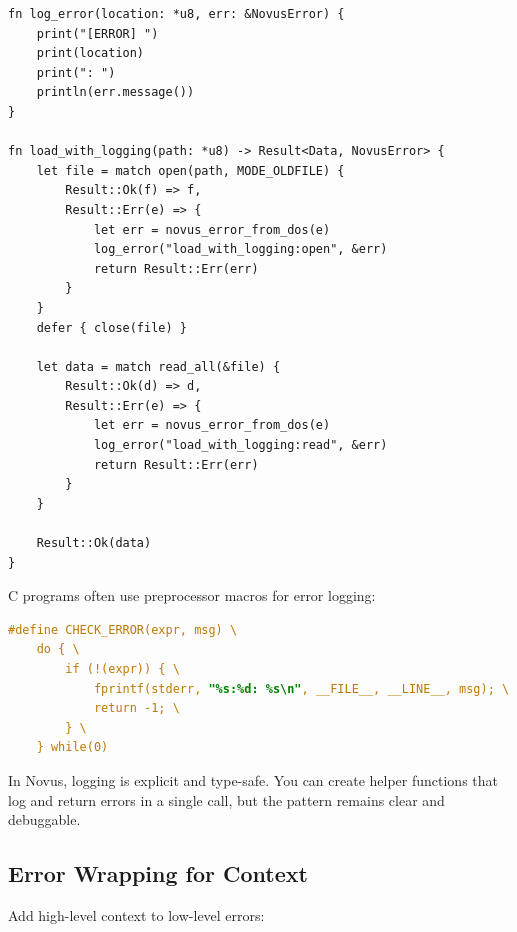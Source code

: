 \begin{lstlisting}
fn log_error(location: *u8, err: &NovusError) {
    print("[ERROR] ")
    print(location)
    print(": ")
    println(err.message())
}

fn load_with_logging(path: *u8) -> Result<Data, NovusError> {
    let file = match open(path, MODE_OLDFILE) {
        Result::Ok(f) => f,
        Result::Err(e) => {
            let err = novus_error_from_dos(e)
            log_error("load_with_logging:open", &err)
            return Result::Err(err)
        }
    }
    defer { close(file) }

    let data = match read_all(&file) {
        Result::Ok(d) => d,
        Result::Err(e) => {
            let err = novus_error_from_dos(e)
            log_error("load_with_logging:read", &err)
            return Result::Err(err)
        }
    }

    Result::Ok(data)
}
\end{lstlisting}

\begin{comingfromc}
C programs often use preprocessor macros for error logging:

\begin{lstlisting}[language=C]
#define CHECK_ERROR(expr, msg) \
    do { \
        if (!(expr)) { \
            fprintf(stderr, "%s:%d: %s\n", __FILE__, __LINE__, msg); \
            return -1; \
        } \
    } while(0)
\end{lstlisting}

In Novus, logging is explicit and type-safe. You can create helper functions that log and return errors in a single call, but the pattern remains clear and debuggable.
\end{comingfromc}

\subsection{Error Wrapping for Context}

Add high-level context to low-level errors:

